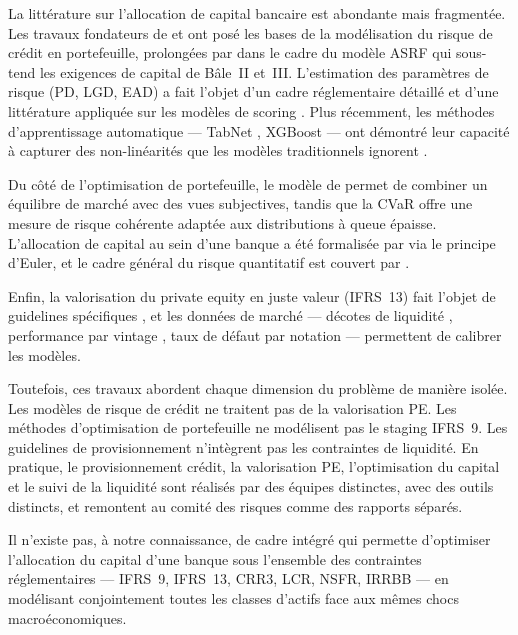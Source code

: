 \documentclass[12pt, a4paper, twoside, openright]{report}
\theoremstyle{definition}
\begin{document}
La littérature sur l'allocation de capital bancaire est abondante mais fragmentée.
Les travaux fondateurs de \citet{merton1974} et \citet{vasicek2002} ont posé les bases de la modélisation du risque de crédit en portefeuille, prolongées par \citet{gordy2003} dans le cadre du modèle ASRF qui sous-tend les exigences de capital de Bâle~II et~III.
L'estimation des paramètres de risque (PD, LGD, EAD) a fait l'objet d'un cadre réglementaire détaillé \citep{eba_gl_2017_06, eba_gl_2019_03} et d'une littérature appliquée sur les modèles de scoring \citep{siddiqi2006, hosmer_lemeshow2013}.
Plus récemment, les méthodes d'apprentissage automatique --- TabNet \citep{arik_pfister2021}, XGBoost \citep{chen_guestrin2016} --- ont démontré leur capacité à capturer des non-linéarités que les modèles traditionnels ignorent \citep{grinsztajn2022}.

Du côté de l'optimisation de portefeuille, le modèle de \citet{black_litterman1992} permet de combiner un équilibre de marché avec des vues subjectives, tandis que la CVaR \citep{rockafellar_uryasev2000} offre une mesure de risque cohérente adaptée aux distributions à queue épaisse.
L'allocation de capital au sein d'une banque a été formalisée par \citet{tasche2008} via le principe d'Euler, et le cadre général du risque quantitatif est couvert par \citet{mcneil_frey_embrechts2015}.

Enfin, la valorisation du private equity en juste valeur (IFRS~13) fait l'objet de guidelines spécifiques \citep{ipev2022}, et les données de marché --- décotes de liquidité \citep{jefferies_lazard2023}, performance par vintage \citep{cambridge2023}, taux de défaut par notation \citep{moodys_default2023} --- permettent de calibrer les modèles.


Toutefois, ces travaux abordent chaque dimension du problème de manière isolée.
Les modèles de risque de crédit ne traitent pas de la valorisation PE.
Les méthodes d'optimisation de portefeuille ne modélisent pas le staging IFRS~9.
Les guidelines de provisionnement n'intègrent pas les contraintes de liquidité.
En pratique, le provisionnement crédit, la valorisation PE, l'optimisation du capital et le suivi de la liquidité sont réalisés par des équipes distinctes, avec des outils distincts, et remontent au comité des risques comme des rapports séparés.

Il n'existe pas, à notre connaissance, de cadre intégré qui permette d'optimiser l'allocation du capital d'une banque sous l'ensemble des contraintes réglementaires --- IFRS~9, IFRS~13, CRR3, LCR, NSFR, IRRBB --- en modélisant conjointement toutes les classes d'actifs face aux mêmes chocs macroéconomiques.
\end{document}
